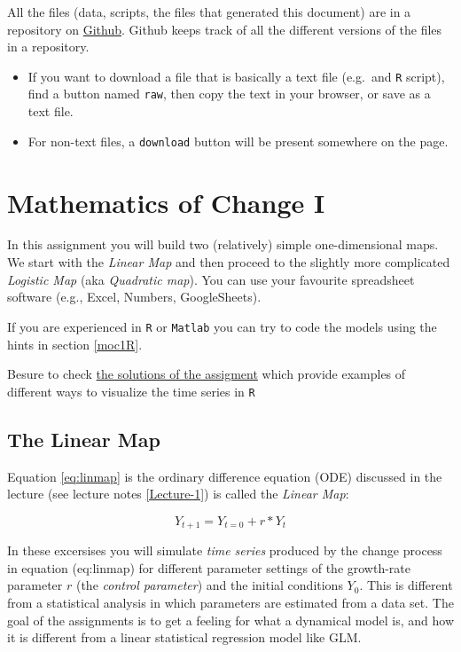 \documentclass[]{book}
\providecommand{\tightlist}{%
  \setlength{\itemsep}{0pt}\setlength{\parskip}{0pt}}
\let\stdsection\section
\renewcommand\section{\newpage\stdsection}
\let\BeginKnitrBlock\begin \let\EndKnitrBlock\end
\begin{document}
All the files (data, scripts, the files that generated this document)
are in a repository on
\href{https://github.com/FredHasselman/DCS}{Github}. Github keeps track
of all the different versions of the files in a repository.

\begin{itemize}
\tightlist
\item
  If you want to download a file that is basically a text file (e.g.~and
  \texttt{R} script), find a button named \texttt{raw}, then copy the
  text in your browser, or save as a text file.
\item
  For non-text files, a \texttt{download} button will be present
  somewhere on the page.
\end{itemize}

\chapter{\texorpdfstring{\textbf{Mathematics of Change
I}}{Mathematics of Change I}}\label{moc1ass}

In this assignment you will build two (relatively) simple
one-dimensional maps. We start with the \emph{Linear Map} and then
proceed to the slightly more complicated \emph{Logistic Map} (aka
\emph{Quadratic map}). You can use your favourite spreadsheet software
(e.g., Excel, Numbers, GoogleSheets).

\BeginKnitrBlock{rmdimportant}
If you are experienced in \texttt{R} or \texttt{Matlab} you can try to
code the models using the hints in section \ref{moc1R}.

Besure to check \protect\hyperlink{moc1Rsol}{the solutions of the
assigment} which provide examples of different ways to visualize the
time series in \texttt{R}
\EndKnitrBlock{rmdimportant}

\section{The Linear Map}\label{the-linear-map}

Equation \eqref{eq:linmap} is the ordinary difference equation (ODE)
discussed in the lecture (see lecture notes \ref{Lecture-1}) is called
the \emph{Linear Map}:

\begin{equation}
Y_{t+1} = Y_{t=0} + r*Y_t
\label{eq:linmap}
\end{equation}

In these excersises you will simulate \emph{time series} produced by the
change process in equation (eq:linmap) for different parameter
settings of the growth-rate parameter \(r\) (the \emph{control
parameter}) and the initial conditions \(Y_0\). This is different from a
statistical analysis in which parameters are estimated from a data set.
The goal of the assignments is to get a feeling for what a dynamical
model is, and how it is different from a linear statistical regression
model like GLM.
\end{document}
